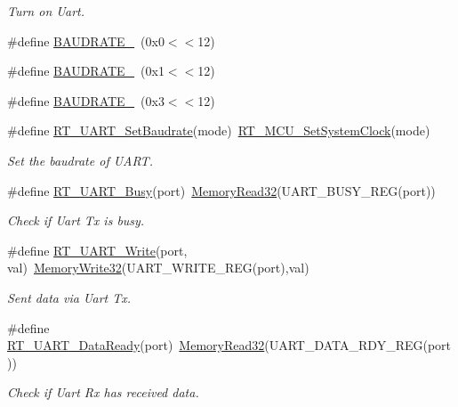 \begin{DoxyCompactItemize}
\begin{DoxyCompactList}\small\item\em Turn on Uart. \end{DoxyCompactList}\item 
\#define \mbox{\hyperlink{a00056_a89d72bee69b33d0404d33f47608d16f0}{B\+A\+U\+D\+R\+A\+T\+E\+\_}}~(0x0$<$$<$12)
\item 
\#define \mbox{\hyperlink{a00056_ab94a89ecf1976f304764aec119e215e7}{B\+A\+U\+D\+R\+A\+T\+E\+\_}}~(0x1$<$$<$12)
\item 
\#define \mbox{\hyperlink{a00056_a9c74d2185a532185624b8dc3086f8e3e}{B\+A\+U\+D\+R\+A\+T\+E\+\_}}~(0x3$<$$<$12)
\item 
\#define \mbox{\hyperlink{a00056_a565befb27caf782083358e0ad81af3a3}{R\+T\+\_\+\+U\+A\+R\+T\+\_\+\+Set\+Baudrate}}(mode)~\mbox{\hyperlink{a00020_a1e578ce669735935a1d505c0edf98221}{R\+T\+\_\+\+M\+C\+U\+\_\+\+Set\+System\+Clock}}(mode)
\begin{DoxyCompactList}\small\item\em Set the baudrate of U\+A\+RT. \end{DoxyCompactList}\item 
\#define \mbox{\hyperlink{a00056_a3ab834a97a200601f16b923a705f3f01}{R\+T\+\_\+\+U\+A\+R\+T\+\_\+\+Busy}}(port)~\mbox{\hyperlink{a00020_a2d484dc15bdf30ee11ab3b05f31f0e16}{Memory\+Read32}}(U\+A\+R\+T\+\_\+\+B\+U\+S\+Y\+\_\+\+R\+EG(port))
\begin{DoxyCompactList}\small\item\em Check if Uart Tx is busy. \end{DoxyCompactList}\item 
\#define \mbox{\hyperlink{a00056_a3c30d4d2e260d1c2f96747e9d7bdaf0d}{R\+T\+\_\+\+U\+A\+R\+T\+\_\+\+Write}}(port,  val)~\mbox{\hyperlink{a00020_a6b9732365b12e48ddb89fe1028b975b0}{Memory\+Write32}}(U\+A\+R\+T\+\_\+\+W\+R\+I\+T\+E\+\_\+\+R\+EG(port),val)
\begin{DoxyCompactList}\small\item\em Sent data via Uart Tx. \end{DoxyCompactList}\item 
\#define \mbox{\hyperlink{a00056_abd2a573ae35e4f6381f9f9758a12806b}{R\+T\+\_\+\+U\+A\+R\+T\+\_\+\+Data\+Ready}}(port)~\mbox{\hyperlink{a00020_a2d484dc15bdf30ee11ab3b05f31f0e16}{Memory\+Read32}}(U\+A\+R\+T\+\_\+\+D\+A\+T\+A\+\_\+\+R\+D\+Y\+\_\+\+R\+EG(port))
\begin{DoxyCompactList}\small\item\em Check if Uart Rx has received data. \end{DoxyCompactList}\item 
$$
\end{DoxyCompactItemize}
